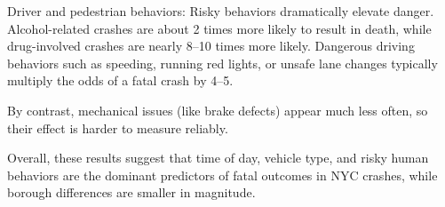 \documentclass[10pt]{article}\usepackage[]{graphicx}\usepackage[]{xcolor}
\begin{document}
Driver and pedestrian behaviors: Risky behaviors dramatically elevate danger. Alcohol-related crashes are about 2 times more likely to result in death, while drug-involved crashes are nearly 8–10 times more likely. Dangerous driving behaviors such as speeding, running red lights, or unsafe lane changes typically multiply the odds of a fatal crash by 4–5.

By contrast, mechanical issues (like brake defects) appear much less often, so their effect is harder to measure reliably.

Overall, these results suggest that time of day, vehicle type, and risky human behaviors are the dominant predictors of fatal outcomes in NYC crashes, while borough differences are smaller in magnitude.
\end{document}
